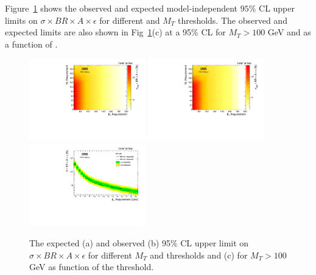   Figure~\ref{fig:limit_MI} shows the observed and expected model-independent $95\%$ CL upper limits on $\sigma\times BR\times A\times\epsilon$ for different \met and $M_{T}$ thresholds. The observed and expected limits are also shown in Fig~\ref{fig:limit_MI}(c) at a 95$\%$ CL for $M_{T}> 100$ GeV and as a function of \met.


\begin{figure}[H]        
\centering                
{\includegraphics[width=0.45\textwidth]{PAS_Plots/pretty/2d_expected.pdf}}
{\includegraphics[width=0.45\textwidth]{PAS_Plots/pretty/2d_observed.pdf}} \\
{\includegraphics[width=0.45\textwidth]{PAS_Plots/LimitPlotVsMET_MT100.pdf}}
\caption{ The expected (a) and observed (b) 95$\%$ CL upper limit on $\sigma \times BR\times A\times\epsilon$ for different $M_{T}$ and \met thresholds and (c) for $M_{T}> 100$ GeV as function of the \met threshold.}
\label{fig:limit_MI}      
\end{figure}    


